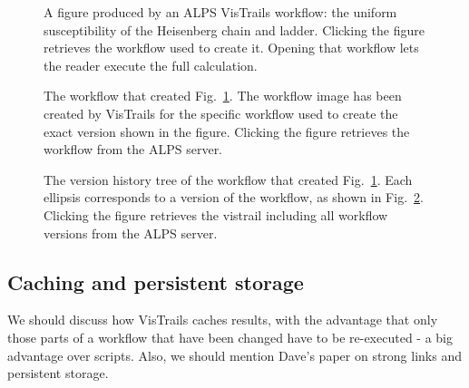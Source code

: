 \documentclass[12pt]{iopart}
\begin{document}
\begin{figure}
\begin{center}

\caption{A figure produced by an ALPS VisTrails workflow: the uniform susceptibility of the Heisenberg chain and ladder. Clicking the figure retrieves the workflow used to 
create it. Opening that workflow lets the reader execute the full calculation.}
\label{fig:figure}
\end{center}
\end{figure}


\begin{figure}
\begin{center}
\caption{The workflow that created Fig.~\ref{fig:figure}. The workflow image has been created by VisTrails for the specific workflow used to create the exact version shown in the figure. Clicking the figure retrieves the workflow from the ALPS server.}
\label{fig:workflow}
\end{center}
\end{figure}



\begin{figure}
\begin{center}
\caption{The version history tree of the workflow that created Fig.~\ref{fig:figure}. Each ellipsis corresponds to a version of the workflow, as shown in Fig.~\ref{fig:workflow}. Clicking the figure retrieves the vistrail including all workflow versions from the ALPS server.}
\label{fig:history}
\end{center}
\end{figure}


\subsection{Caching and persistent storage}

We should discuss how VisTrails caches results, with the advantage that only those parts of a workflow that have been changed have to be re-executed - a big advantage over scripts. Also, we should mention Dave's paper on strong links and persistent storage.
\end{document}
